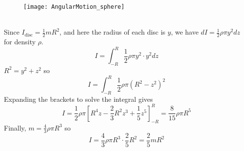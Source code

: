 \begin{hint}
{\begin{enumerate}
\begin{figure}[h] 
\centering
\texttt{[image: AngularMotion\_sphere]}
\caption{}
\label{fig:AngularMotion_sphere}
\end{figure}
\\
Since $I_{\textrm{disc}}=\frac{1}{2}mR^2$, and here the radius of each disc is $y$, we have $dI=\frac{1}{2}\rho\pi y^2dz$ for density $\rho$. 
\begin{equation*}
I=\int^R_{-R}\frac{1}{2}\rho\pi y^2\cdot y^2 dz 
\end{equation*}
$R^2=y^2+z^2$ so 
\begin{equation*}
I=\int^R_{-R}\frac{1}{2}\rho\pi \left(R^2-z^2\right)^2
\end{equation*}
Expanding the brackets to solve the integral gives 
\begin{equation*}
I=\frac{1}{2}\rho\pi\left[R^4z-\frac{2}{3}R^2z^3+\frac{1}{5}z^5\right]^R_{-R}=\frac{8}{15}\rho\pi R^5
\end{equation*}
Finally, $m=\frac{4}{3}\rho\pi R^3$ so 
\begin{equation*}
I=\frac{4}{3}\rho\pi R^3\cdot \frac{2}{5}R^2=\frac{2}{5}mR^2
\end{equation*}
\end{enumerate}
}
\end{hint}